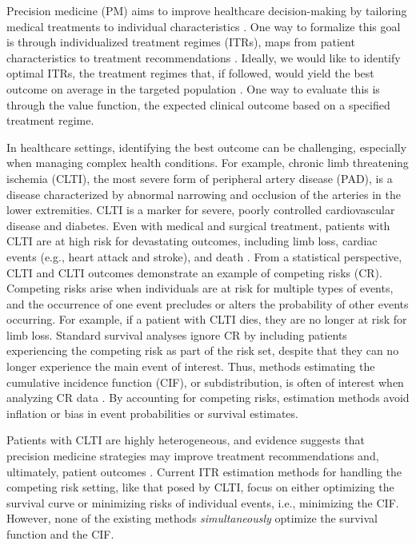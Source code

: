 Precision medicine (PM) aims to improve healthcare decision-making by tailoring medical treatments to individual characteristics \citep{kosorok2015adaptive, 
jiang_estimation_2017,
Moodie2020, 
kosorok_introduction_2021}.
One way to formalize this goal is through individualized treatment regimes (ITRs), maps from patient characteristics to treatment recommendations \citep{kosorok_precision_2019}. Ideally, we would like to identify optimal ITRs, the treatment regimes that, if followed, would yield the best outcome on average in the targeted population \citep{kosorok_precision_2019, kosorok2015adaptive}. One way to evaluate this is through the value function, the expected clinical outcome based on a specified treatment regime.

In healthcare settings, identifying the best outcome can be challenging, especially when managing complex health conditions. For example, chronic limb threatening ischemia (CLTI), the most severe form of peripheral artery disease (PAD), is a disease characterized by abnormal narrowing and occlusion of the arteries in the lower extremities. CLTI is a marker for severe, poorly controlled cardiovascular disease and diabetes. Even with medical and surgical treatment, patients with CLTI are at high risk for devastating outcomes, including limb loss, cardiac events (e.g., heart attack and stroke), and death \citep{criqui_lower_2021}. From a statistical perspective, CLTI and CLTI outcomes demonstrate an example of competing risks (CR). Competing risks arise when individuals are at risk for multiple types of events, and the occurrence of one event precludes or alters the probability of other events occurring. For example, if a patient with CLTI dies, they are no longer at risk for limb loss. Standard survival analyses ignore CR by including patients experiencing the competing risk as part of the risk set, despite that they can no longer experience the main event of interest. Thus, methods estimating the cumulative incidence function (CIF), or subdistribution, is often of interest when analyzing CR data \citep{kalbfleisch1980statistical, fine_proportional_1999, austin_introduction_2016}. By accounting for competing risks, estimation methods avoid inflation or bias in event probabilities or survival estimates.

Patients with CLTI are highly heterogeneous, and evidence suggests that precision medicine strategies may improve treatment recommendations and, ultimately, patient outcomes \citep{mcginigle_precision_2021, chung_analysis_2022}. Current ITR estimation methods for handling the competing risk setting, like that posed by CLTI, focus on either optimizing the survival curve or minimizing risks of individual events, i.e., minimizing the CIF. However, none of the existing methods \textit{simultaneously} optimize the survival function and the CIF. 

